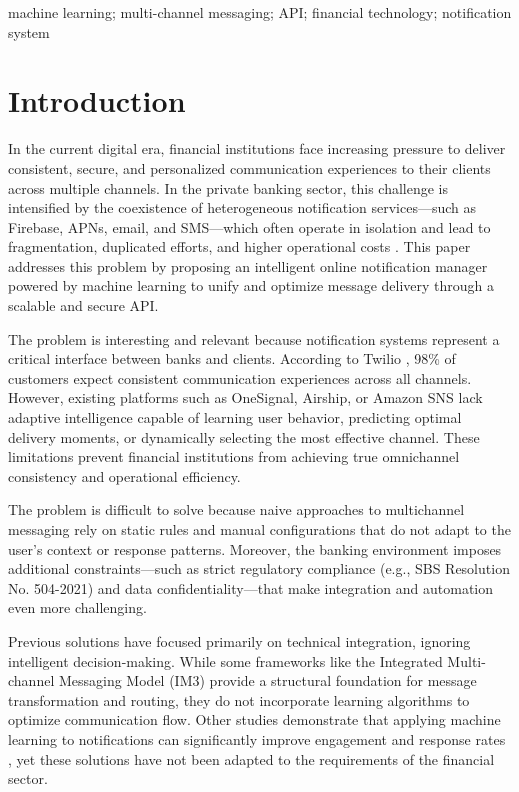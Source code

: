 \documentclass[conference]{IEEEtran}
\newenvironment{customkeywords}{
  \vspace{0.5em}
  \noindent{\emph{\textbf{Keywords -}}}\hspace{0.5em}\itshape
}{\par\vspace{1em}}
\begin{document}
\begin{customkeywords}
machine learning; multi-channel messaging; API; financial technology; notification system
\end{customkeywords}

\section{Introduction}

In the current digital era, financial institutions face increasing pressure to deliver consistent, secure, and personalized communication experiences to their clients across multiple channels. In the private banking sector, this challenge is intensified by the coexistence of heterogeneous notification services—such as Firebase, APNs, email, and SMS—which often operate in isolation and lead to fragmentation, duplicated efforts, and higher operational costs \cite{alzahrani2020}. This paper addresses this problem by proposing an intelligent online notification manager powered by machine learning to unify and optimize message delivery through a scalable and secure API.

The problem is interesting and relevant because notification systems represent a critical interface between banks and clients. According to Twilio \cite{twilio2023}, 98\% of customers expect consistent communication experiences across all channels. However, existing platforms such as OneSignal, Airship, or Amazon SNS lack adaptive intelligence capable of learning user behavior, predicting optimal delivery moments, or dynamically selecting the most effective channel. These limitations prevent financial institutions from achieving true omnichannel consistency and operational efficiency.

The problem is difficult to solve because naive approaches to multichannel messaging rely on static rules and manual configurations that do not adapt to the user’s context or response patterns. Moreover, the banking environment imposes additional constraints—such as strict regulatory compliance (e.g., SBS Resolution No. 504-2021) and data confidentiality—that make integration and automation even more challenging.

Previous solutions have focused primarily on technical integration, ignoring intelligent decision-making. While some frameworks like the Integrated Multi-channel Messaging Model (IM3) \cite{liang2011} provide a structural foundation for message transformation and routing, they do not incorporate learning algorithms to optimize communication flow. Other studies demonstrate that applying machine learning to notifications can significantly improve engagement and response rates \cite{rahimi2021}, yet these solutions have not been adapted to the requirements of the financial sector.
\end{document}
